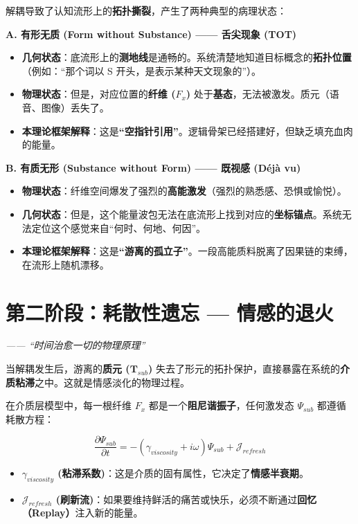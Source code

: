 解耦导致了认知流形上的\textbf{拓扑撕裂}，产生了两种典型的病理状态：

\textbf{A. 有形无质 (Form without Substance) —— 舌尖现象 (TOT)}
\begin{itemize}
    \item   \textbf{几何状态}：底流形上的\textbf{测地线}是通畅的。系统清楚地知道目标概念的\textbf{拓扑位置}（例如：“那个词以 S 开头，是表示某种天文现象的”）。
    \item   \textbf{物理状态}：但是，对应位置的\textbf{纤维 ($F_x$)} 处于\textbf{基态}，无法被激发。质元（语音、图像）丢失了。
    \item   \textbf{本理论框架解释}：这是\textbf{“空指针引用”}。逻辑骨架已经搭建好，但缺乏填充血肉的能量。
\end{itemize}

\textbf{B. 有质无形 (Substance without Form) —— 既视感 (Déjà vu)}
\begin{itemize}
    \item   \textbf{物理状态}：纤维空间爆发了强烈的\textbf{高能激发}（强烈的熟悉感、恐惧或愉悦）。
    \item   \textbf{几何状态}：但是，这个能量波包无法在底流形上找到对应的\textbf{坐标锚点}。系统无法定位这个感觉来自“何时、何地、何因”。
    \item   \textbf{本理论框架解释}：这是\textbf{“游离的孤立子”}。一段高能质料脱离了因果链的束缚，在流形上随机漂移。
\end{itemize}

\section{第二阶段：耗散性遗忘 — 情感的退火}
\label{sec:dissipation_phase}

\textit{—— “时间治愈一切的物理原理”}

当解耦发生后，游离的\textbf{质元 ($\mathbf{T}_{sub}$)} 失去了形元的拓扑保护，直接暴露在系统的\textbf{介质粘滞}之中。这就是情感淡化的物理过程。


在介质层模型中，每一根纤维 $F_x$ 都是一个\textbf{阻尼谐振子}，任何激发态 $\Psi_{sub}$ 都遵循耗散方程：

$$ \frac{\partial \Psi_{sub}}{\partial t} = -(\gamma_{viscosity} + i\omega) \Psi_{sub} + \mathcal{J}_{refresh} $$

\begin{itemize}
    \item   \textbf{$\gamma_{viscosity}$ (粘滞系数)}：这是介质的固有属性，它决定了\textbf{情感半衰期}。
    \item   \textbf{$\mathcal{J}_{refresh}$ (刷新流)}：如果要维持鲜活的痛苦或快乐，必须不断通过\textbf{回忆（Replay）}注入新的能量。
\end{itemize}

